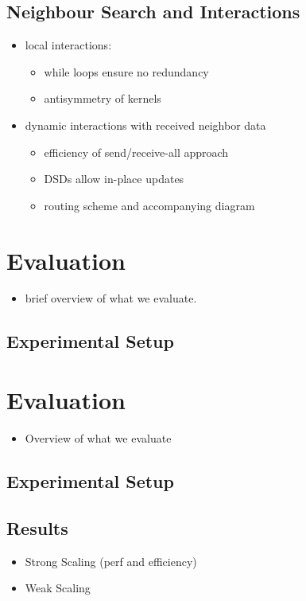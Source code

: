 \documentclass[review, anonymous, acmsmall]{acmart}
\begin{document}
\subsection{Neighbour Search and Interactions}
\begin{itemize}
  \item local interactions:
  \begin{itemize}
    \item while loops ensure no redundancy
    \item antisymmetry of kernels
  \end{itemize}
  \item dynamic interactions with received neighbor data
  \begin{itemize}
    \item efficiency of send/receive-all approach
    \item DSDs allow in-place updates
    \item routing scheme and accompanying diagram
  \end{itemize}
\end{itemize}

\section{Evaluation}
\begin{itemize}
  \item brief overview of what we evaluate.
\end{itemize}
\subsection{Experimental Setup}
\section{Evaluation}
\begin{itemize}
  \item Overview of what we evaluate
\end{itemize}
\subsection{Experimental Setup}
\subsection{Results}
\begin{itemize}
  \item Strong Scaling (perf and efficiency)
  \item Weak Scaling
\end{itemize}
\end{document}
